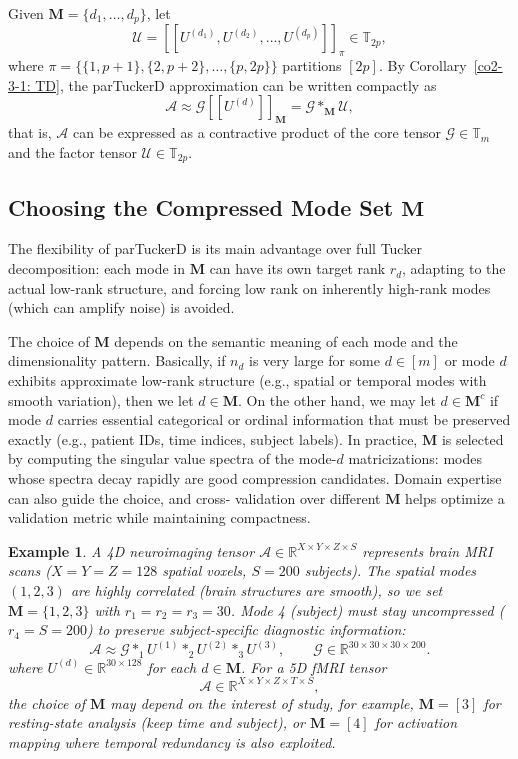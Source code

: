 \documentclass[11pt, oneside]{article}  %
\newtheorem{exm}[thm]{Example}
\newcommand{\dsb}[1]{[\![#1]\!]}
\newcommand{\RR}{\mathbb{R}}
\newcommand{\TT}{\mathbb{T}}
\newcommand{\A}{\mathcal{A}}
\newcommand{\caG}{\mathcal{G}}
\newcommand{\caM}{\mathbf{M}}
\newcommand{\U}{\mathcal{U}}
\newcommand{\beq}{\begin{equation}}
\newcommand{\eeq}{\end{equation}}
\begin{document}
Given $\caM=\{d_1,\ldots,d_p\}$, let
\[
\U=\dsb{U^{(d_1)}, U^{(d_2)}, \ldots, U^{(d_p)}}_{\pi}\in\TT_{2p},
\]
where $\pi=\{\{1,p+1\},\{2,p+2\},\ldots,\{p,2p\}\}$ partitions $[2p]$.  By Corollary~\ref{co2-3-1: TD}, the parTuckerD approximation can be written compactly as
\beq\label{eq:parTuckerD2}
\A \approx \caG\dsb{U^{(d)}}_{\caM} = \caG\ast_{\caM}\U,
\eeq
that is, $\A$ can be expressed as a contractive product of the core tensor $\caG\in\TT_{m}$ and the factor tensor $\U\in\TT_{2p}$.  

\subsection{Choosing the Compressed Mode Set \texorpdfstring{$\caM$}{M}}
\label{sec5-2}

The flexibility of parTuckerD is its main advantage over full Tucker decomposition: each mode in $\caM$ can have its own target rank $r_d$, adapting to the actual low-rank structure, and forcing low rank on inherently high-rank modes (which can amplify noise) is avoided.

The choice of $\caM$ depends on the semantic meaning of each mode and the dimensionality pattern. Basically, if $n_d$ is very large for some 
$d\in [m]$ or mode $d$ exhibits approximate low-rank structure (e.g., spatial or temporal modes with smooth variation), then we let $d\in\caM$.
On the other hand, we may let $d\in\caM^{c}$ if mode $d$ carries essential categorical or ordinal information that must be preserved exactly 
(e.g., patient IDs, time indices, subject labels).  In practice, $\caM$ is selected by computing the singular value spectra of the mode-$d$ 
matricizations: modes whose spectra decay rapidly are good compression candidates.  Domain expertise can also guide the choice, and cross-
validation over different $\caM$ helps optimize a validation metric while maintaining compactness.

\begin{exm}\label{exm5-1}
A 4D neuroimaging tensor $\A\in\RR^{X\times Y\times Z\times S}$ represents brain MRI scans ($X=Y=Z=128$ spatial voxels, $S=200$ 
subjects).  The spatial modes $(1,2,3)$ are highly correlated (brain structures are smooth), so we set $\caM=\{1,2,3\}$ with $r_1=r_2=r_3=30$.  
Mode 4 (subject) must stay uncompressed ($r_4=S=200$) to preserve subject-specific diagnostic information:
\[
\A \approx \caG \ast_1 U^{(1)} \ast_2 U^{(2)} \ast_3 U^{(3)},\qquad \caG\in\RR^{30\times30\times30\times200}.
\]
where $U^{(d)}\in\RR^{30\times 128}$ for each $d\in\caM$.  For a 5D fMRI tensor 
\[
\A\in\RR^{X\times Y\times Z\times T\times S},
\] 
the choice of $\caM$ may depend on the interest of study, for example, $\caM=[3]$ for resting-state analysis (keep time and subject), or 
$\caM=[4]$ for activation mapping where temporal redundancy is also exploited.
\end{exm}
\end{document}
